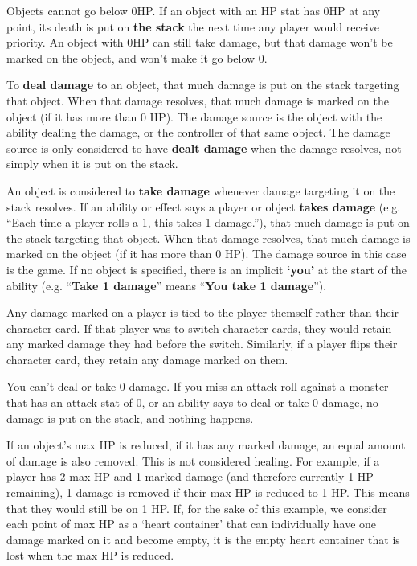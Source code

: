 \documentclass[a4paper, twoside]{report} %
\begin{document}
    Objects cannot go below 0HP. If an object with an HP stat has 0HP at any point, its death is put on \textbf{the stack} the next time any player would receive priority. An object with 0HP can still take damage, but that damage won’t be marked on the object, and won’t make it go below 0.

    To \textbf{deal damage} to an object, that much damage is put on the stack targeting that object. When that damage resolves, that much damage is marked on the object (if it has more than 0 HP). The damage source is the object with the ability dealing the damage, or the controller of that same object. The damage source is only considered to have \textbf{dealt damage} when the damage resolves, not simply when it is put on the stack.

    An object is considered to \textbf{take damage} whenever damage targeting it on the stack resolves. If an ability or effect says a player or object \textbf{takes damage} (e.g. “Each time a player rolls a 1, this takes 1 damage.”), that much damage is put on the stack targeting that object. When that damage resolves, that much damage is marked on the object (if it has more than 0 HP). The damage source in this case is the game. If no object is specified, there is an implicit \textbf{‘you’} at the start of the ability (e.g. “\textbf{Take 1 damage}” means “\textbf{You take 1 damage}”).

    Any damage marked on a player is tied to the player themself rather than their character card. If that player was to switch character cards, they would retain any marked damage they had before the switch. Similarly, if a player flips their character card, they retain any damage marked on them.

    You can’t deal or take 0 damage. If you miss an attack roll against a monster that has an attack stat of 0, or an ability says to deal or take 0 damage, no damage is put on the stack, and nothing happens.

    If an object’s max HP is reduced, if it has any marked damage, an equal amount of damage is also removed. This is not considered healing. For example, if a player has 2 max HP and 1 marked damage (and therefore currently 1 HP remaining), 1 damage is removed if their max HP is reduced to 1 HP. This means that they would still be on 1 HP. If, for the sake of this example, we consider each point of max HP as a ‘heart container’ that can individually have one damage marked on it and become empty, it is the empty heart container that is lost when the max HP is reduced.
\end{document}
